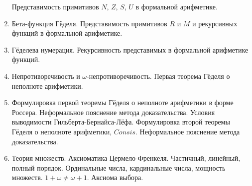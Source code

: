 \documentclass[11pt,a4paper,oneside]{scrartcl}
\begin{document}
\begin{enumerate}
Представимость примитивов $N$, $Z$, $S$, $U$ в формальной арифметике.
\item Бета-функция Гёделя. Представимость примитивов $R$ и $M$ и рекурсивных функций в формальной арифметике.
\item Гёделева нумерация. Рекурсивность представимых в формальной арифметике функций.
\item Непротиворечивость и $\omega$-непротиворечивость. Первая теорема Гёделя о неполноте арифметики.
\item Формулировка первой теоремы Гёделя о неполноте арифметики в форме Россера. Неформальное пояснение метода
доказательства.
Условия выводимости Гильберта-Бернайса-Лёфа. Формулировка второй теоремы Гёделя о неполноте арифметики, $Consis$. 
Неформальное пояснение метода доказательства.
\item Теория множеств. Аксиоматика Цермело-Френкеля. Частичный, линейный, полный порядок.
Ординальные числа, кардинальные числа, мощность множеств. $1+\omega\ne\omega+1$. Аксиома выбора.
\end{enumerate}
\end{document}
